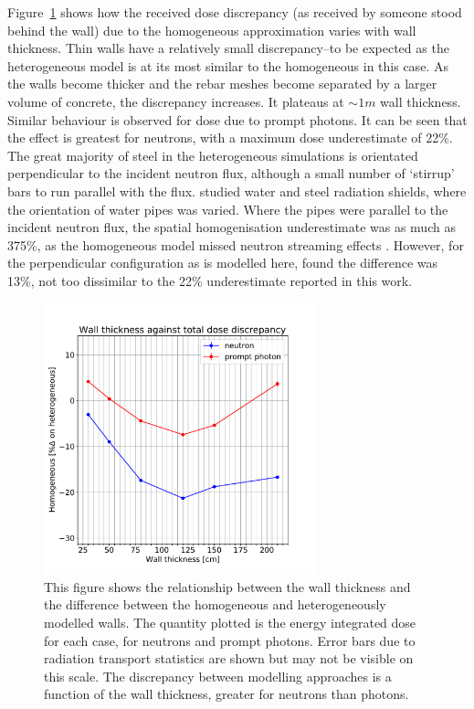 Figure~\ref{fig:dose_discrepancy} shows how the received dose discrepancy (as received by someone stood behind the wall) due to the homogeneous approximation varies with wall thickness. Thin walls have a relatively small discrepancy--to be expected as the heterogeneous model is at its most similar to the homogeneous in this case. As the walls become thicker and the rebar meshes become separated by a larger volume of concrete, the discrepancy increases. It plateaus at $\sim 1m$ wall thickness. Similar behaviour is observed for dose due to prompt photons. It can be seen that the effect is greatest for neutrons, with a maximum dose underestimate of 22\%. The great majority of steel in the heterogeneous simulations is orientated perpendicular to the incident neutron flux, although a small number of `stirrup' bars to run parallel with the flux. \citeauthor{Pampin2007} studied water and steel radiation shields, where the orientation of water pipes was varied. Where the pipes were parallel to the incident neutron flux, the spatial homogenisation underestimate was as much as 375\%, as the homogeneous model missed neutron streaming effects \cite{Pampin2007}. However, for the perpendicular configuration as is modelled here, \citeauthor{Pampin2007} found the difference was 13\%, not too dissimilar to the 22\% underestimate reported in this work.

\begin{figure}[H]
  \centering
  \includegraphics[width=0.7\textwidth]{wall_thickness}
  \caption[Homogeneous error as function of wall thickness.]{This figure shows the relationship between the wall thickness and the difference between the homogeneous and heterogeneously modelled walls. The quantity plotted is the energy integrated dose for each case, for neutrons and prompt photons. Error bars due to radiation transport statistics are shown but may not be visible on this scale. The discrepancy between modelling approaches is a function of the wall thickness, greater for neutrons than photons.}
  \label{fig:dose_discrepancy}
\end{figure}

